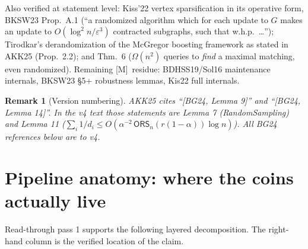 \documentclass[11pt]{article}
\newcommand{\statusM}{\textsf{\footnotesize[M]}}
\newcommand{\ORS}{\mathsf{ORS}}
\newtheorem{remark}{Remark}
\begin{document}
\noindent Also verified at statement level: Kiss'22 vertex sparsification in
its operative form, BKSW23 Prop.~A.1 (``a randomized algorithm which for each
update to $G$ makes an update to $O(\log^2 n/\varepsilon^3)$ contracted
subgraphs, such that w.h.p.\ \dots''); Tirodkar's derandomization of the
McGregor boosting framework as stated in AKK25 (Prop.~2.2); and
\cite{ACK19} Thm.~6 ($\Omega(n^2)$ queries to \emph{find} a maximal
matching, even randomized). Remaining \statusM\ residue: BDHSS19/Sol16
maintenance internals, BKSW23 \S5+ robustness lemmas, Kis22 full internals.

\begin{remark}[Version numbering]
AKK25 cites ``[BG24, Lemma 9]'' and ``[BG24, Lemma 14]''. In the v4 text
those statements are \emph{Lemma 7} (RandomSampling) and \emph{Lemma 11}
($\sum_i 1/d_i \le O(\alpha^{-2}\,\ORS_n(r(1{-}\alpha))\log n)$). All BG24
references below are to v4.
\end{remark}

\section{Pipeline anatomy: where the coins actually live}\label{sec:anatomy}

Read-through pass 1 supports the following layered decomposition. The
right-hand column is the verified location of the claim.
\end{document}
